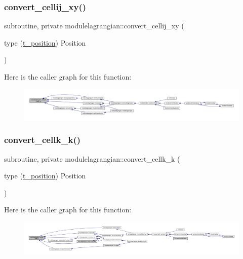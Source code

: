 \subsubsection{\texorpdfstring{convert\+\_\+cellij\+\_\+xy()}{convert\_cellij\_xy()}}
{\footnotesize\ttfamily subroutine, private modulelagrangian\+::convert\+\_\+cellij\+\_\+xy (\begin{DoxyParamCaption}\item[{type (\mbox{\hyperlink{structmodulelagrangian_1_1t__position}{t\+\_\+position}})}]{Position }\end{DoxyParamCaption})\hspace{0.3cm}{\ttfamily [private]}}

Here is the caller graph for this function\+:\nopagebreak
\begin{figure}[H]
\begin{center}
\leavevmode
\includegraphics[width=350pt]{namespacemodulelagrangian_afc4e34e45162b06f3c0a80ae1e000fe8_icgraph}
\end{center}
\end{figure}
\mbox{\label{namespacemodulelagrangian_ab49d9104b72e09c3e511a3c37180d96b}} 
\subsubsection{\texorpdfstring{convert\+\_\+cellk\+\_\+k()}{convert\_cellk\_k()}}
{\footnotesize\ttfamily subroutine, private modulelagrangian\+::convert\+\_\+cellk\+\_\+k (\begin{DoxyParamCaption}\item[{type (\mbox{\hyperlink{structmodulelagrangian_1_1t__position}{t\+\_\+position}})}]{Position }\end{DoxyParamCaption})\hspace{0.3cm}{\ttfamily [private]}}

Here is the caller graph for this function\+:\nopagebreak
\begin{figure}[H]
\begin{center}
\leavevmode
\includegraphics[width=350pt]{namespacemodulelagrangian_ab49d9104b72e09c3e511a3c37180d96b_icgraph}
\end{center}
\end{figure}
\mbox{\label{namespacemodulelagrangian_a57a623f0deb9516670279b9b6aad02a1}} 
